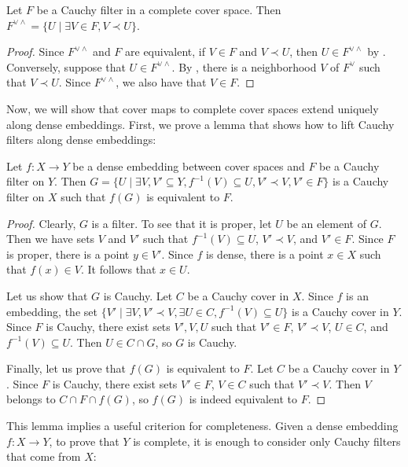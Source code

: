 \documentclass[reqno]{amsart}
\theoremstyle{definition}
\theoremstyle{remark}
\numberwithin{figure}{section}
\newcommand{\rb}{\prec}
\begin{document}
\begin{lem}
Let $F$ be a Cauchy filter in a complete cover space.
Then $F^{\vee \wedge} = \{ U \mid \exists V \in F, V \rb U \}$.
\end{lem}
\begin{proof}
Since $F^{\vee \wedge}$ and $F$ are equivalent, if $V \in F$ and $V \rb U$, then $U \in F^{\vee \wedge}$ by .
Conversely, suppose that $U \in F^{\vee \wedge}$.
By , there is a neighborhood $V$ of $F^\vee$ such that $V \rb U$.
Since $F^{\vee \wedge}$, we also have that $V \in F$.
\end{proof}

Now, we will show that cover maps to complete cover spaces extend uniquely along dense embeddings.
First, we prove a lemma that shows how to lift Cauchy filters along dense embeddings:

\begin{lem}
Let $f : X \to Y$ be a dense embedding between cover spaces and $F$ be a Cauchy filter on $Y$.
Then $G = \{ U \mid \exists V,V' \subseteq Y, f^{-1}(V) \subseteq U, V' \rb V, V' \in F \}$ is a Cauchy filter on $X$ such that $f(G)$ is equivalent to $F$.
\end{lem}
\begin{proof}
Clearly, $G$ is a filter.
To see that it is proper, let $U$ be an element of $G$.
Then we have sets $V$ and $V'$ such that $f^{-1}(V) \subseteq U$, $V' \rb V$, and $V' \in F$.
Since $F$ is proper, there is a point $y \in V'$.
Since $f$ is dense, there is a point $x \in X$ such that $f(x) \in V$.
It follows that $x \in U$.

Let us show that $G$ is Cauchy.
Let $C$ be a Cauchy cover in $X$.
Since $f$ is an embedding, the set $\{ V' \mid \exists V, V' \rb V, \exists U \in C, f^{-1}(V) \subseteq U \}$ is a Cauchy cover in $Y$.
Since $F$ is Cauchy, there exist sets $V',V,U$ such that $V' \in F$, $V' \rb V$, $U \in C$, and $f^{-1}(V) \subseteq U$.
Then $U \in C \cap G$, so $G$ is Cauchy.

Finally, let us prove that $f(G)$ is equivalent to $F$.
Let $C$ be a Cauchy cover in $Y$.
Since $F$ is Cauchy, there exist sets $V' \in F$, $V \in C$ such that $V' \rb V$.
Then $V$ belongs to $C \cap F \cap f(G)$, so $f(G)$ is indeed equivalent to $F$.
\end{proof}

This lemma implies a useful criterion for completeness.
Given a dense embedding $f : X \to Y$, to prove that $Y$ is complete, it is enough to consider only Cauchy filters that come from $X$:
\end{document}

